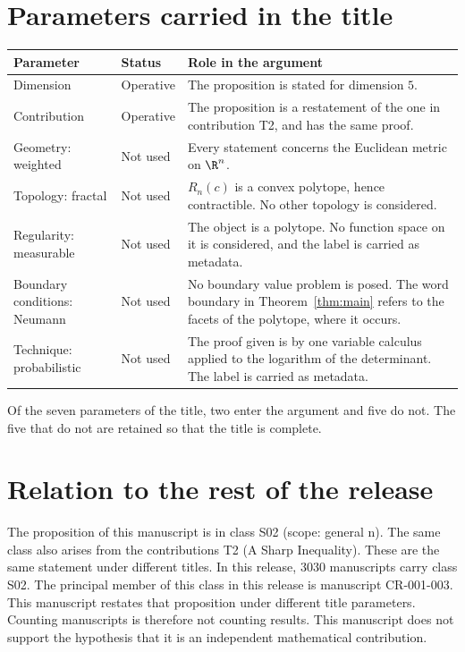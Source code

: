 \documentclass[11pt]{article}
\begin{document}
\section{Parameters carried in the title}\label{sec:params}
\begin{center}
\small
\begin{tabular}{p{}p{}p{}}
\toprule
Parameter & Status & Role in the argument \\
\midrule
Dimension & Operative & The proposition is stated for dimension $5$. \\
Contribution & Operative & The proposition is a restatement of the one in contribution T2, and has the same proof. \\
Geometry: weighted & Not used & Every statement concerns the Euclidean metric on $\R^n$. \\
Topology: fractal & Not used & $R_n(c)$ is a convex polytope, hence contractible. No other topology is considered. \\
Regularity: measurable & Not used & The object is a polytope. No function space on it is considered, and the label is carried as metadata. \\
Boundary conditions: Neumann & Not used & No boundary value problem is posed. The word boundary in Theorem~\ref{thm:main} refers to the facets of the polytope, where it occurs. \\
Technique: probabilistic & Not used & The proof given is by one variable calculus applied to the logarithm of the determinant. The label is carried as metadata. \\
\bottomrule
\end{tabular}
\end{center}
Of the seven parameters of the title, two enter the argument and five do not. The five that do not are retained so that the title is complete.

\section{Relation to the rest of the release}
The proposition of this manuscript is in class S02 (scope: general n). The same class also arises from the contributions T2 (A Sharp Inequality). These are the same statement under different titles.
In this release, 3030 manuscripts carry class S02. The principal member of this class in this release is manuscript CR-001-003. This manuscript restates that proposition under different title parameters.
Counting manuscripts is therefore not counting results. This manuscript does not support the hypothesis that it is an independent mathematical contribution.
\end{document}
